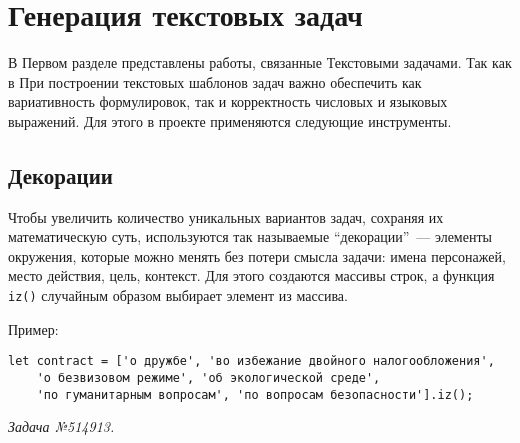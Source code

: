 \section{Генерация текстовых задач}

В Первом разделе представлены работы, связанные Текстовыми задачами. 
Так как в 
При построении текстовых шаблонов задач важно обеспечить как вариативность формулировок, так и корректность числовых и языковых выражений. Для этого в проекте применяются следующие инструменты.

\subsection{Декорации}

Чтобы увеличить количество уникальных вариантов задач, сохраняя их математическую суть, используются так называемые ``декорации''~--- элементы окружения, которые можно менять без потери смысла задачи: имена персонажей, место действия, цель, контекст. 
Для этого создаются массивы строк, а функция \texttt{iz()} случайным образом выбирает элемент из массива.

Пример:
\begin{lstlisting}
let contract = ['о дружбе', 'во избежание двойного налогообложения',
    'о безвизовом режиме', 'об экологической среде',
    'по гуманитарным вопросам', 'по вопросам безопасности'].iz();
\end{lstlisting}
\textsl{Задача №514913.}

